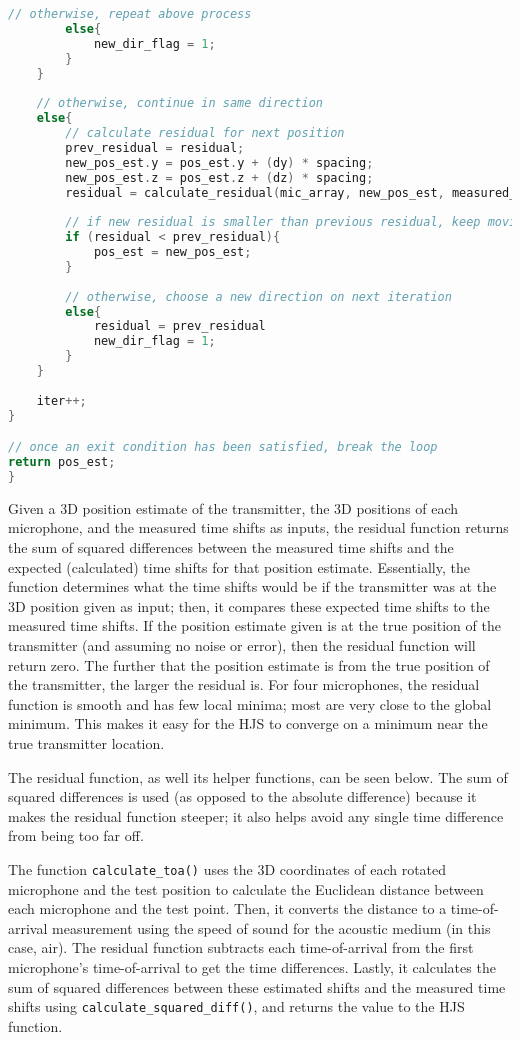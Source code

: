 \documentclass[12pt,a4paper]{report}
\begin{document}
\begin{lstlisting}[language=C++]
		// otherwise, repeat above process
		else{
			new_dir_flag = 1;
		}
	}
	
	// otherwise, continue in same direction
	else{
		// calculate residual for next position
		prev_residual = residual;
		new_pos_est.y = pos_est.y + (dy) * spacing;
		new_pos_est.z = pos_est.z + (dz) * spacing;
		residual = calculate_residual(mic_array, new_pos_est, measured_time_shifts);
		
		// if new residual is smaller than previous residual, keep moving in that direction
		if (residual < prev_residual){
			pos_est = new_pos_est;
		}
		
		// otherwise, choose a new direction on next iteration
		else{
			residual = prev_residual
			new_dir_flag = 1;
		}
	}
	
	iter++;
}

// once an exit condition has been satisfied, break the loop
return pos_est;
}
\end{lstlisting}

Given a 3D position estimate of the transmitter, the 3D positions of each microphone, and the measured time shifts as inputs, the residual function returns the sum of squared differences between the measured time shifts and the expected (calculated) time shifts for that position estimate. Essentially, the function determines what the time shifts would be if the transmitter was at the 3D position given as input; then, it compares these expected time shifts to the measured time shifts. If the position estimate given is at the true position of the transmitter (and assuming no noise or error), then the residual function will return zero. The further that the position estimate is from the true position of the transmitter, the larger the residual is. For four microphones, the residual function is smooth and has few local minima; most are very close to the global minimum. This makes it easy for the HJS to converge on a minimum near the true transmitter location.

The residual function, as well its helper functions, can be seen below. The sum of squared differences is used (as opposed to the absolute difference) because it makes the residual function steeper; it also helps avoid any single time difference from being too far off. 

The function \verb|calculate_toa()| uses the 3D coordinates of each rotated microphone and the test position to calculate the Euclidean distance between each microphone and the test point. Then, it converts the distance to a time-of-arrival measurement using the speed of sound for the acoustic medium (in this case, air). The residual function subtracts each time-of-arrival from the first microphone’s time-of-arrival to get the time differences. Lastly, it calculates the sum of squared differences between these estimated shifts and the measured time shifts using \verb|calculate_squared_diff()|, and returns the value to the HJS function.
\end{document}
